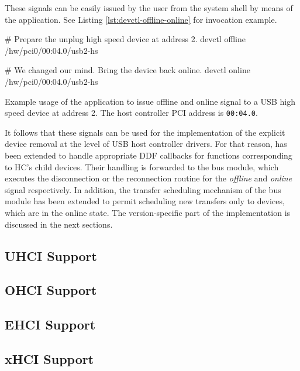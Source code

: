 These signals can be easily issued by the user from the system shell by means
of the  application. See Listing \ref{lst:devctl-offline-online}
for invocation example.

\begin{listing}[H]
	\begin{bdsh}
		# Prepare the unplug high speed device at address 2.
		devctl offline /hw/pci0/00:04.0/usb2-hs

		# We changed our mind. Bring the device back online.
		devctl online /hw/pci0/00:04.0/usb2-hs
	\end{bdsh}
	\caption[Example usage of  to issue offline and online
	signal.]{Example usage of the  application to issue offline and
	online signal to a USB high speed device at address 2. The host controller
	PCI address is \texttt{00:04.0}.}
	\label{lst:devctl-offline-online}
\end{listing}

It follows that these signals can be used for the implementation of the
explicit device removal at the level of USB host controller drivers. For that
reason,  has been extended to handle appropriate DDF callbacks
for functions corresponding to HC's child devices. Their handling is forwarded
to the bus module, which executes the disconnection or the reconnection routine
for the \textit{offline} and \textit{online} signal respectively. In addition,
the transfer scheduling mechanism of the bus module has been extended to permit
scheduling new transfers only to devices, which are in the online state. The
version-specific part of the implementation is discussed in the next sections.


\subsection{UHCI Support}


\subsection{OHCI Support}


\subsection{EHCI Support}


\subsection{xHCI Support}

